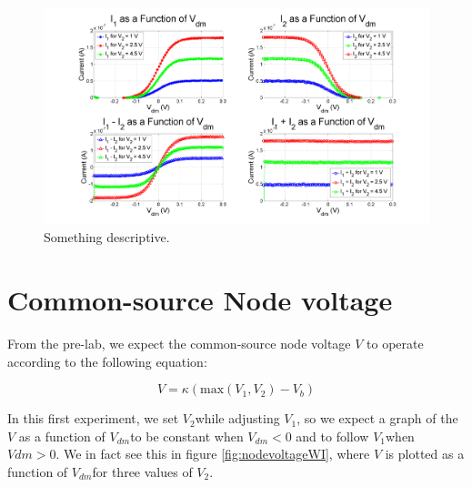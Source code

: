 \documentclass{article}
\newcommand{\Vtwo}{{$V_{2}$}}
\newcommand{\Vone}{{$V_{1}$}}
\newcommand{\Vdm}{{$V_{dm}$}}
\begin{document}
\begin{figure}[H]
\centering
\includegraphics[width=\linewidth]{./Figures/AllCurrentsSubplot}
\caption{Something descriptive.}
\label{fig:AllCurrentsSubplot}
\end{figure}

\section*{Common-source Node voltage}

From the pre-lab, we expect the common-source node voltage $V$ to operate according to the following equation:

\begin{equation}
V = \kappa (\textrm{max}(V_1,V_2) - V_b)
\label{eq:nodevoltageeq}
\end{equation}

In this first experiment, we set \Vtwo while adjusting \Vone, so we expect a graph of the $V$ as a function of \Vdm to be constant when $V_{dm} < 0$ and to follow \Vone when $V{dm} > 0$. We in fact see this in figure \ref{fig:nodevoltageWI}, where $V$ is plotted as a function of \Vdm for three values of \Vtwo.
\end{document}
